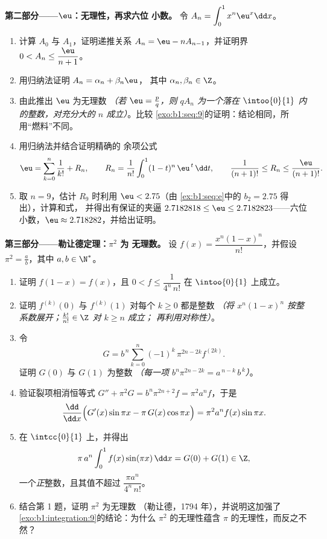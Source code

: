 \begin{problem}
\medskip
\noindent\textbf{第二部分——$\eu$：无理性，再求六位
小数。} 令 $A_n = \displaystyle\int_0^1 x^n \eu^x \dd x$。
\begin{enumerate}[resume]
  \item 计算 $A_0$ 与 $A_1$，证明递推关系 $A_n = \eu
        - n A_{n-1}$，并证明界 $0 < A_n \leq
        \dfrac{\eu}{n+1}$。
  \item 用归纳法证明 $A_n = \alpha_n + \beta_n \eu$，
        其中 $\alpha_n, \beta_n \in \Z$。
  \item 由此推出 $\eu$ 为无理数 \emph{（若 $\eu = \frac
        pq$，则 $q A_n$ 为一个落在
        $\intoo{0}{1}$ 内的整数，对充分大的 $n$ 成立）}。比较
        \cref{exo:b1:seq:9}的证明：结论相同，所用“燃料”不同。
  \item 用归纳法并结合证明精确的
        余项公式
        \[
        \eu = \sum_{k=0}^{n} \frac{1}{k!} + R_n,
        \qquad
        R_n = \frac{1}{n!}\int_0^1 (1 - t)^n\,\eu^{\,t}\,\dd t,
        \qquad
        \frac{1}{(n+1)!} \leq R_n \leq \frac{\eu}{(n+1)!} .
        \]
  \item 取 $n = 9$，估计 $R_9$ 时利用 $\eu < 2.75$（由
        \cref{ex:b1:seq:e}中的 $b_2 = 2.75$ 得出），计算和式，
        并得出有保证的夹逼 $2.7182818 \leq
        \eu \leq 2.7182823$——六位小数，$\eu \approx
        2.718282$，并给出证明。
\end{enumerate}

\medskip
\noindent\textbf{第三部分——勒让德定理：$\pi^2$ 为
无理数。} 设 $f(x) = \dfrac{x^n (1 - x)^n}{n!}$，并假设
$\pi^2 = \frac ab$，其中 $a, b \in \N^*$。
\begin{enumerate}[resume]
  \item 证明 $f(1 - x) = f(x)$，且 $0 < f \leq
        \dfrac{1}{4^n\,n!}$ 在 $\intoo{0}{1}$ 上成立。
  \item 证明 $f^{(k)}(0)$ 与 $f^{(k)}(1)$ 对每个
        $k \geq 0$ 都是整数 \emph{（将 $x^n(1-x)^n$ 按整
        系数展开；$\frac{k!}{n!} \in \Z$ 对 $k \geq n$ 成立；
        再利用对称性）}。
  \item 令
        \[
        G = b^{\,n} \sum_{k=0}^{n} (-1)^k\,
        \pi^{2n - 2k} f^{(2k)} .
        \]
        证明 $G(0)$ 与 $G(1)$ 为整数 \emph{（每一项
        $b^n \pi^{2n-2k} = a^{\,n-k}\,b^{\,k}$）}。
  \item 验证裂项相消恒等式 $G'' + \pi^2 G = b^n \pi^{2n+2} f
        = \pi^2 a^n f$，于是
        \[
        \frac{\dd}{\dd x}\Bigl(G'(x)\sin \pi x - \pi\,G(x)\cos
        \pi x\Bigr) = \pi^2 a^n f(x)\sin \pi x .
        \]
  \item 在 $\intcc{0}{1}$ 上，并得出
        \[
        \pi\,a^n \int_0^1 f(x)\sin(\pi x)\,\dd x = G(0) + G(1)
        \in \Z ,
        \]
        一个\emph{正}整数，且其值不超过 $\dfrac{\pi
        a^n}{4^n\,n!}$。
  \item 结合第 1 题，证明 $\pi^2$ 为无理数
        （勒让德，1794 年），并说明这加强了
        \cref{exo:b1:integration:9}的结论：为什么
        $\pi^2$ 的无理性蕴含 $\pi$ 的无理性，而反之不然？
\end{enumerate}


\end{problem}
